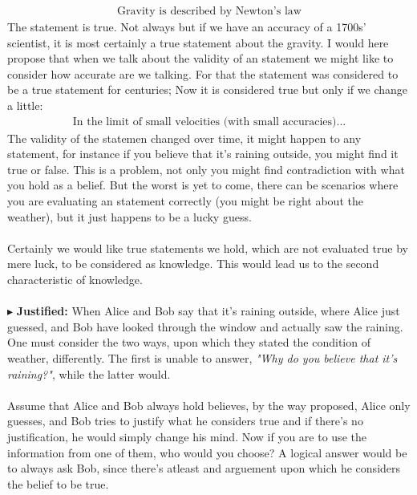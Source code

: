 \documentclass[9pt,a4paper,twocolumn]{article}
\newcommand{\newpoint}[1]{\indent$\blacktriangleright$ \textbf{#1}}
\begin{document}
                \begin{align*}
                    \text{Gravity is described by Newton's law}
                \end{align*}
                The statement is true. Not always but if we have an accuracy of a 1700s' scientist, it is most certainly a true statement about the gravity. I would here propose that when we talk about the validity of an statement we might like to consider how accurate are we talking. For that the statement was considered to be a true statement for centuries; Now it is considered true but only if we change a little:
                \begin{align*}
                    \text{In the limit of small velocities (with small accuracies)...}
                \end{align*}
                The validity of the statemen changed over time, it might happen to any statement, for instance if you believe that it's raining outside, you might find it true or false. This is a problem, not only you might find contradiction with what you hold as a belief. But the worst is yet to come, there can be scenarios where you are evaluating an statement correctly (you might be right about the weather), but it just happens to be a lucky guess. 
                \\
                \\
                Certainly we would like true statements we hold, which are not evaluated true by mere luck, to be considered as knowledge. This would lead us to the second characteristic of knowledge.
                \\
                \\
                \newpoint{Justified:} When Alice and Bob say that it's raining outside, where Alice just guessed, and Bob have looked through the window and actually saw the raining. One must consider the two ways, upon which they stated the condition of weather, differently. The first is unable to answer, \textit{"Why do you believe that it's raining?"}, while the latter would.
                \\
                \\
                Assume that Alice and Bob always hold believes, by the way proposed, Alice only guesses, and Bob tries to justify what he considers true and if there's no justification, he would simply change his mind. Now if you are to use the information from one of them, who would you choose? A logical answer would be to always ask Bob, since there's atleast and arguement upon which he considers the belief to be true. 
\end{document}
